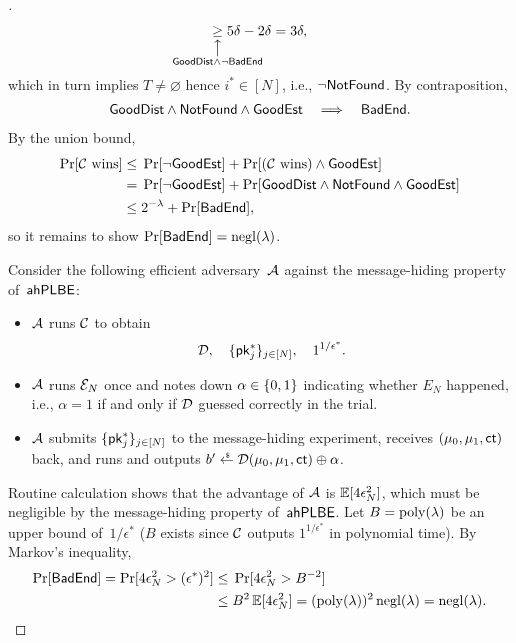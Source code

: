 \begin{proof}[]
\begin{align*}
\underset{\mathclap{\substack{
\big\uparrow\\\GoodDist\wedge\neg\BadEnd\vphantom{G}
}}}{\geq}
5\delta-2\delta
=
3\delta,
\end{align*}
which in turn implies ${T\neq\varnothing}$ hence ${i^\ast\in[N]}$, i.e.,
${\neg\NotFound}$.
By contraposition,
\begin{align*}
\GoodDist\wedge\NotFound\wedge\GoodEst
\quad\Longrightarrow\quad
\BadEnd.
\end{align*}
By the union bound,
\begin{align*}
\Pr[\scriptC\textup{ wins}]
\leq{}&
\Pr[\neg\GoodEst]
+
\Pr[(\scriptC\textup{ wins})\wedge\GoodEst]
\\{}={}&
\Pr[\neg\GoodEst]
+
\Pr[\GoodDist\wedge\NotFound\wedge\GoodEst]
\\{}\leq{}&
2^{-\lambda}
+
\Pr[\BadEnd],
\end{align*}
so it remains to show ${\Pr[\BadEnd]=\negl(\lambda)}$.

Consider the following efficient adversary~${\mathcal{A}}$ against the message-hiding property of~$\AHPLBE$:
\begin{itemize}
\item ${\mathcal{A}}$ runs ${\mathcal{C}}$ to obtain
\begin{align*}
\scriptD,\quad
\{\pk^\ast_j\}_{j\in[N]},\quad
1^{1/\epsilon^\ast}.
\end{align*}
\item ${\mathcal{A}}$ runs ${\mathcal{E}}_N$ once and
notes down ${\alpha\in{\{0,1\}}}$ indicating whether $E_N$ happened,
i.e., ${\alpha=1}$ if and only if ${\mathcal{D}}$ guessed correctly in the trial.
\item ${\mathcal{A}}$ submits $\{\pk^\ast_j\}_{j\in[N]}$ to the message-hiding experiment, receives $(\mu_0,\mu_1,\ct)$ back, and
runs and outputs ${b'\draws\scriptD(\mu_0,\mu_1,\ct)\oplus\alpha}$.
\end{itemize}
Routine calculation shows that the advantage of ${\mathcal{A}}$ is
${\E[4\epsilon_N^2]}$,
which must be negligible by the message-hiding property of~$\AHPLBE$.
Let ${B=\operatorname{poly}(\lambda)}$ be an upper bound of~$1/\epsilon^\ast$
($B$ exists since ${\mathcal{C}}$ outputs $1^{1/\epsilon^\ast}$ in polynomial time).
By Markov's inequality,
\begin{align*}
\WideNarrow{}{\hspace*{-3em}}
\Pr[\BadEnd]
=
\Pr[4\epsilon_N^2>(\epsilon^\ast)^2]
\leq{}&
\Pr[4\epsilon_N^2>B^{-2}]
\\{}\leq{}&
B^2\E[4\epsilon_N^2]
=
(\poly(\lambda))^2\negl(\lambda)
=
\negl(\lambda).
\WideNarrow{}{\hspace*{-2em}}
\qedhere
\end{align*}
\end{proof}
